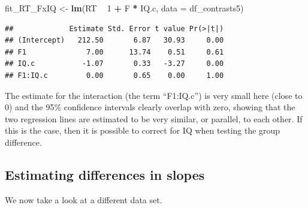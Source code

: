 \documentclass[12pt,]{krantz}
\newenvironment{Shaded}{\begin{snugshade}}{\end{snugshade}}
\newcommand{\DataTypeTok}[1]{\textcolor[rgb]{0.13,0.29,0.53}{#1}}
\newcommand{\DecValTok}[1]{\textcolor[rgb]{0.00,0.00,0.81}{#1}}
\newcommand{\KeywordTok}[1]{\textcolor[rgb]{0.13,0.29,0.53}{\textbf{#1}}}
\newcommand{\NormalTok}[1]{#1}
\newcommand{\OperatorTok}[1]{\textcolor[rgb]{0.81,0.36,0.00}{\textbf{#1}}}
\newcommand{\StringTok}[1]{\textcolor[rgb]{0.31,0.60,0.02}{#1}}
\begin{document}
\begin{Shaded}
\begin{Highlighting}[]
\NormalTok{fit_RT_FxIQ <-}\StringTok{ }\KeywordTok{lm}\NormalTok{(RT }\OperatorTok{~}\StringTok{ }\DecValTok{1} \OperatorTok{+}\StringTok{ }\NormalTok{F }\OperatorTok{*}\StringTok{ }\NormalTok{IQ.c,}
                 \DataTypeTok{data =}\NormalTok{ df_contrasts5)}
\end{Highlighting}
\end{Shaded}

\begin{Shaded}
\end{Shaded}

\begin{verbatim}
##             Estimate Std. Error t value Pr(>|t|)
## (Intercept)   212.50       6.87   30.93     0.00
## F1              7.00      13.74    0.51     0.61
## IQ.c           -1.07       0.33   -3.27     0.00
## F1:IQ.c         0.00       0.65    0.00     1.00
\end{verbatim}

The estimate for the interaction (the term ``F1:IQ.c'') is very small here (close to 0) and the 95\% confidence intervals clearly overlap with zero, showing that the two regression lines are estimated to be very similar, or parallel, to each other. If this is the case, then it is possible to correct for IQ when testing the group difference.

\hypertarget{estimating-differences-in-slopes}{%
\subsection{Estimating differences in slopes}\label{estimating-differences-in-slopes}}

We now take a look at a different data set.

\begin{Shaded}
\end{Shaded}
\end{document}
